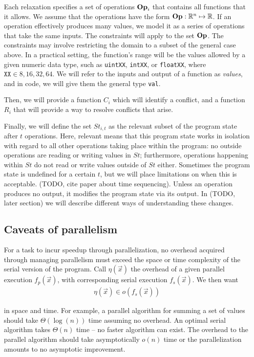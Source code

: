 Each relaxation specifies a set of operations $\mathrm{\mathbf{Op}}_{i}$ that contains all
functions that it allows. We assume that the operations have the form $\mathrm{\mathbf{Op}}:
\mathbb{R}^{n} \mapsto \mathbb{R}$. If an operation effectively produces many
values, we model it as a series of operations that take the same inputs.  The
constraints will apply to the set $\mathrm{\mathbf{Op}}$. The constraints may involve restricting
the domain to a subset of the general case above. In a practical setting, the
function's range will be the values allowed by a given numeric data type, such
as \texttt{uintXX}, \texttt{intXX}, or \texttt{float{XX}}, where $\texttt{XX}
\in {8, 16, 32, 64}$. We will refer to the inputs and output of a function as
\emph{values}, and in code, we will give them the general type \texttt{val}.

Then, we will provide a function $C_i$ which will identify a conflict, and a
function $R_i$ that will provide a way to resolve conflicts that arise.

Finally, we will define the set $St_{i,t}$ as the relevant subset of the program
state after $t$ operations. Here, relevant means that this program state works
in isolation with regard to all other operations taking place within the
program: no outside operations are reading or writing values in $St$;
furthermore, operations happening within $St$ do not read or write values
outside of $St$ either. Sometimes the program state is undefined for a certain
$t$, but we will place limitations on when this is acceptable. (TODO, cite paper
about time sequencing). Unless an operation produces no output, it modifies the
program state via its output. In (TODO, later section) we will describe
different ways of understanding these changes.

\subsection{Caveats of parallelism}
For a task to incur speedup through parallelization, no overhead acquired
through managing parallelism must exceed the space or time complexity of the
serial version of the program. Call $\eta(\vec{x})$ the overhead of a given
parallel execution $f_p(\vec{x})$, with corresponding serial execution
$f_s(\vec{x})$. We then want
\begin{align*}
    \eta(\vec{x}) \in o(f_s(\vec{x}))
\end{align*}

in space and time. For example, a parallel algorithm for summing a set of values
should take $\Theta(\log(n))$ time assuming no overhead. An optimal serial
algorithm takes $\Theta(n)$ time -- no faster algorithm can exist. The overhead
to the parallel algorithm should take asymptotically $o(n)$ time or the
parallelization amounts to no asymptotic improvement.

